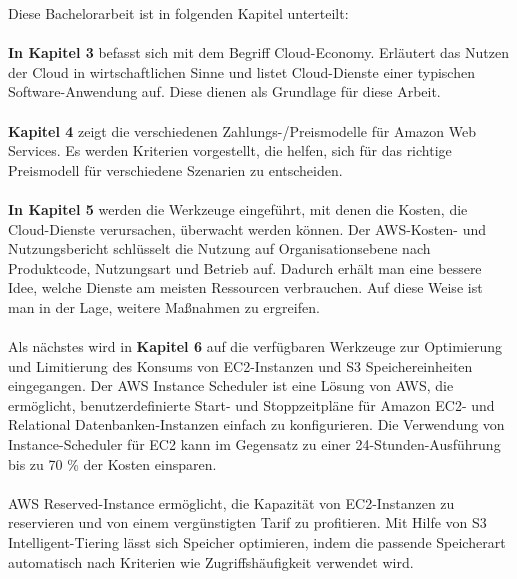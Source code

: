Diese Bachelorarbeit ist in folgenden Kapitel unterteilt:\\\\
\textbf{In Kapitel 3} 
befasst sich mit dem Begriff Cloud-Economy. Erläutert das Nutzen der Cloud in wirtschaftlichen Sinne und listet Cloud-Dienste einer typischen Software-Anwendung auf. Diese dienen als Grundlage für diese Arbeit. \\\\
\textbf{Kapitel 4} 
zeigt die verschiedenen Zahlungs-/Preismodelle für Amazon Web Services. Es werden Kriterien vorgestellt, die helfen, sich für das richtige Preismodell für verschiedene Szenarien zu entscheiden. 
\\\\
\textbf{In Kapitel 5} werden die Werkzeuge eingeführt, mit denen die Kosten, die Cloud-Dienste verursachen, überwacht werden können. Der AWS-Kosten- und Nutzungsbericht schlüsselt die Nutzung auf Organisationsebene nach Produktcode, Nutzungsart und Betrieb auf. Dadurch erhält man eine bessere Idee, welche Dienste am meisten Ressourcen verbrauchen. Auf diese Weise ist man in der Lage, weitere Maßnahmen zu ergreifen.
\\\\
Als nächstes wird in \textbf{Kapitel 6} auf die verfügbaren Werkzeuge zur Optimierung und Limitierung des Konsums von EC2-Instanzen und S3 Speichereinheiten eingegangen. Der AWS Instance Scheduler ist eine Lösung von AWS, die ermöglicht, benutzerdefinierte Start- und Stoppzeitpläne für Amazon EC2- und Relational Datenbanken-Instanzen einfach zu konfigurieren. Die Verwendung von Instance-Scheduler für EC2 kann im Gegensatz zu einer 24-Stunden-Ausführung bis zu 70 \% der Kosten einsparen.
\\\\
AWS Reserved-Instance ermöglicht, die Kapazität von EC2-Instanzen zu reservieren und von einem vergünstigten Tarif zu profitieren. Mit Hilfe von S3 Intelligent-Tiering lässt sich Speicher optimieren, indem die passende Speicherart automatisch nach Kriterien wie Zugriffshäufigkeit verwendet wird.
\\\\
 
